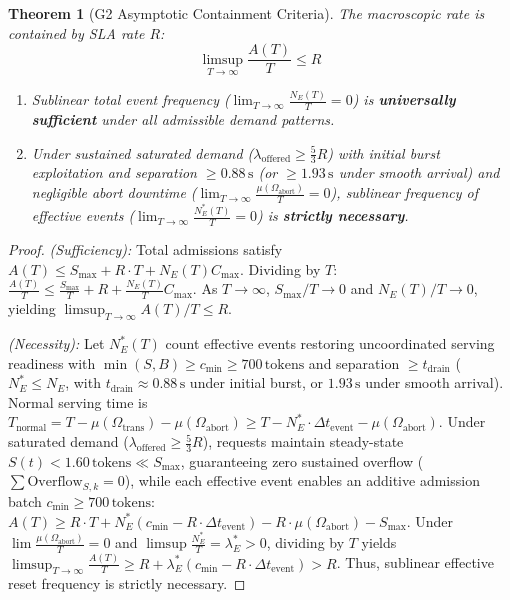 \documentclass[conference]{IEEEtran}
\newtheorem{theorem}{Theorem}
\begin{document}
\begin{theorem}[G2 Asymptotic Containment Criteria]
The macroscopic rate is contained by SLA rate $R$:
\begin{equation}
\limsup_{T\to\infty} \frac{A(T)}{T} \le R
\end{equation}
\begin{enumerate}
    \item Sublinear total event frequency ($\lim_{T\to\infty} \frac{N_E(T)}{T} = 0$) is \textbf{universally sufficient} under all admissible demand patterns.
    \item Under sustained saturated demand ($\lambda_{\text{offered}} \ge \frac{5}{3} R$) with initial burst exploitation and separation $\ge 0.88\,\text{s}$ (or $\ge 1.93\,\text{s}$ under smooth arrival) and negligible abort downtime ($\lim_{T\to\infty} \frac{\mu(\Omega_{\text{abort}})}{T} = 0$), sublinear frequency of effective events ($\lim_{T\to\infty} \frac{N_E^*(T)}{T} = 0$) is \textbf{strictly necessary}.
\end{enumerate}
\end{theorem}
\begin{proof}
\textit{(Sufficiency):} Total admissions satisfy $A(T) \le S_{\max} + R \cdot T + N_E(T) C_{\max}$. Dividing by $T$: $\frac{A(T)}{T} \le \frac{S_{\max}}{T} + R + \frac{N_E(T)}{T} C_{\max}$. As $T \to \infty$, $S_{\max}/T \to 0$ and $N_E(T)/T \to 0$, yielding $\limsup_{T\to\infty} A(T)/T \le R$.

\textit{(Necessity):} Let $N_E^*(T)$ count effective events restoring uncoordinated serving readiness with $\min(S, B) \ge c_{\min} \ge 700\,\text{tokens}$ and separation $\ge t_{\text{drain}}$ ($N_E^* \le N_E$, with $t_{\text{drain}} \approx 0.88\,\text{s}$ under initial burst, or $1.93\,\text{s}$ under smooth arrival). Normal serving time is $T_{\text{normal}} = T - \mu(\Omega_{\text{trans}}) - \mu(\Omega_{\text{abort}}) \ge T - N_E^* \cdot \Delta t_{\text{event}} - \mu(\Omega_{\text{abort}})$. Under saturated demand ($\lambda_{\text{offered}} \ge \frac{5}{3} R$), requests maintain steady-state $S(t) < 1.60\,\text{tokens} \ll S_{\max}$, guaranteeing zero sustained overflow ($\sum \text{Overflow}_{S, k} = 0$), while each effective event enables an additive admission batch $c_{\min} \ge 700\,\text{tokens}$: $A(T) \ge R \cdot T + N_E^*(c_{\min} - R \cdot \Delta t_{\text{event}}) - R \cdot \mu(\Omega_{\text{abort}}) - S_{\max}$. Under $\lim \frac{\mu(\Omega_{\text{abort}})}{T} = 0$ and $\limsup \frac{N_E^*}{T} = \lambda_E^* > 0$, dividing by $T$ yields $\limsup_{T\to\infty} \frac{A(T)}{T} \ge R + \lambda_E^*(c_{\min} - R \cdot \Delta t_{\text{event}}) > R$. Thus, sublinear effective reset frequency is strictly necessary.
\end{proof}
\end{document}
